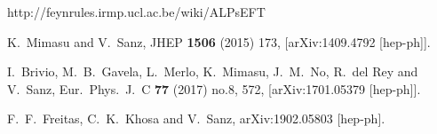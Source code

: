 \documentclass[aps,onecolumn,showpacs,superscriptaddress,groupedaddress,nofootinbib,preprint]{revtex4-1}
\begin{document}
\begin{thebibliography}{99}
http://feynrules.irmp.ucl.ac.be/wiki/ALPsEFT

  K.~Mimasu and V.~Sanz,
  JHEP {\bf 1506} (2015) 173,
  [arXiv:1409.4792 [hep-ph]].



  I.~Brivio, M.~B.~Gavela, L.~Merlo, K.~Mimasu, J.~M.~No, R.~del Rey and V.~Sanz,
  Eur.\ Phys.\ J.\ C {\bf 77} (2017) no.8,  572,
  [arXiv:1701.05379 [hep-ph]].


  F.~F.~Freitas, C.~K.~Khosa and V.~Sanz,
  arXiv:1902.05803 [hep-ph].

\end{thebibliography}
\end{document}
